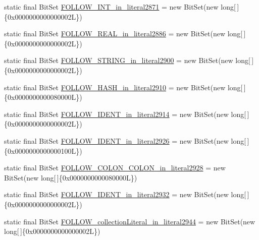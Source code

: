 \begin{DoxyCompactItemize}
\item 
static final Bit\-Set \hyperlink{classorg_1_1tzi_1_1use_1_1parser_1_1testsuite_1_1_test_suite_parser_af576b5a71ce7e0e3b50a84deef409852}{F\-O\-L\-L\-O\-W\-\_\-\-I\-N\-T\-\_\-in\-\_\-literal2871} = new Bit\-Set(new long\mbox{[}$\,$\mbox{]}\{0x0000000000000002\-L\})
\item 
static final Bit\-Set \hyperlink{classorg_1_1tzi_1_1use_1_1parser_1_1testsuite_1_1_test_suite_parser_a740eaa7e04af35208f6e8f6b436e2327}{F\-O\-L\-L\-O\-W\-\_\-\-R\-E\-A\-L\-\_\-in\-\_\-literal2886} = new Bit\-Set(new long\mbox{[}$\,$\mbox{]}\{0x0000000000000002\-L\})
\item 
static final Bit\-Set \hyperlink{classorg_1_1tzi_1_1use_1_1parser_1_1testsuite_1_1_test_suite_parser_a84408fa17f306d2a14d94aedb1d6459f}{F\-O\-L\-L\-O\-W\-\_\-\-S\-T\-R\-I\-N\-G\-\_\-in\-\_\-literal2900} = new Bit\-Set(new long\mbox{[}$\,$\mbox{]}\{0x0000000000000002\-L\})
\item 
static final Bit\-Set \hyperlink{classorg_1_1tzi_1_1use_1_1parser_1_1testsuite_1_1_test_suite_parser_ada4d4240ec50bb6bf636fa5486b8d83c}{F\-O\-L\-L\-O\-W\-\_\-\-H\-A\-S\-H\-\_\-in\-\_\-literal2910} = new Bit\-Set(new long\mbox{[}$\,$\mbox{]}\{0x0000000000080000\-L\})
\item 
static final Bit\-Set \hyperlink{classorg_1_1tzi_1_1use_1_1parser_1_1testsuite_1_1_test_suite_parser_a88797cc4d8db33c510b8623f4803fe57}{F\-O\-L\-L\-O\-W\-\_\-\-I\-D\-E\-N\-T\-\_\-in\-\_\-literal2914} = new Bit\-Set(new long\mbox{[}$\,$\mbox{]}\{0x0000000000000002\-L\})
\item 
static final Bit\-Set \hyperlink{classorg_1_1tzi_1_1use_1_1parser_1_1testsuite_1_1_test_suite_parser_a1a6e8e0609a4699a6454e227e12f3de3}{F\-O\-L\-L\-O\-W\-\_\-\-I\-D\-E\-N\-T\-\_\-in\-\_\-literal2926} = new Bit\-Set(new long\mbox{[}$\,$\mbox{]}\{0x0000000000000100\-L\})
\item 
static final Bit\-Set \hyperlink{classorg_1_1tzi_1_1use_1_1parser_1_1testsuite_1_1_test_suite_parser_a8eca3639571587f4b8ac9d680c0ba327}{F\-O\-L\-L\-O\-W\-\_\-\-C\-O\-L\-O\-N\-\_\-\-C\-O\-L\-O\-N\-\_\-in\-\_\-literal2928} = new Bit\-Set(new long\mbox{[}$\,$\mbox{]}\{0x0000000000080000\-L\})
\item 
static final Bit\-Set \hyperlink{classorg_1_1tzi_1_1use_1_1parser_1_1testsuite_1_1_test_suite_parser_a3f1320af49099d4c258d974d34bf6d0f}{F\-O\-L\-L\-O\-W\-\_\-\-I\-D\-E\-N\-T\-\_\-in\-\_\-literal2932} = new Bit\-Set(new long\mbox{[}$\,$\mbox{]}\{0x0000000000000002\-L\})
\item 
static final Bit\-Set \hyperlink{classorg_1_1tzi_1_1use_1_1parser_1_1testsuite_1_1_test_suite_parser_ad79efd4c60b43cd9b4b5d700568a4612}{F\-O\-L\-L\-O\-W\-\_\-collection\-Literal\-\_\-in\-\_\-literal2944} = new Bit\-Set(new long\mbox{[}$\,$\mbox{]}\{0x0000000000000002\-L\})

\end{DoxyCompactItemize}
